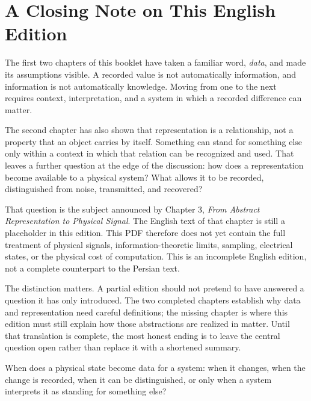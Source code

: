 \chapter*{A Closing Note on This English Edition}

The first two chapters of this booklet have taken a familiar word, \emph{data}, and made its assumptions visible. A recorded value is not automatically information, and information is not automatically knowledge. Moving from one to the next requires context, interpretation, and a system in which a recorded difference can matter.

The second chapter has also shown that representation is a relationship, not a property that an object carries by itself. Something can stand for something else only within a context in which that relation can be recognized and used. That leaves a further question at the edge of the discussion: how does a representation become available to a physical system? What allows it to be recorded, distinguished from noise, transmitted, and recovered?

That question is the subject announced by Chapter 3, \emph{From Abstract Representation to Physical Signal}. The English text of that chapter is still a placeholder in this edition. This PDF therefore does not yet contain the full treatment of physical signals, information-theoretic limits, sampling, electrical states, or the physical cost of computation. This is an incomplete English edition, not a complete counterpart to the Persian text.

The distinction matters. A partial edition should not pretend to have answered a question it has only introduced. The two completed chapters establish why data and representation need careful definitions; the missing chapter is where this edition must still explain how those abstractions are realized in matter. Until that translation is complete, the most honest ending is to leave the central question open rather than replace it with a shortened summary.

When does a physical state become data for a system: when it changes, when the change is recorded, when it can be distinguished, or only when a system interprets it as standing for something else?
